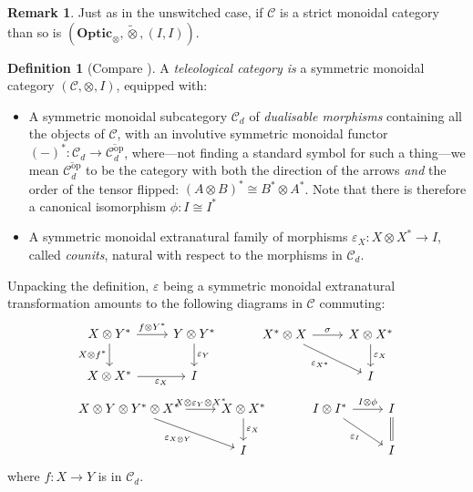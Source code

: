 \documentclass[11pt,a4paper]{article}
\theoremstyle{plain}
\theoremstyle{definition}
\newtheorem{definition}[theorem]{Definition}
\newtheorem{remark}[theorem]{Remark}
\newcommand{\C}{\mathscr{C}}
\newcommand{\Optic}{\mathbf{Optic}}
\newcommand{\switched}{\mathbin{\tilde{\otimes}}}
\newcommand{\op}{\mathrm{op}}
\begin{document}
\begin{remark}
  Just as in the unswitched case, if $\C$ is a strict monoidal category than so is $(\Optic_\otimes, \switched, (I, I))$.
\end{remark}

\begin{definition}[Compare {\cite[Definition 5.1]{CoherenceForLenses}}]
  A \emph{teleological category is} a symmetric monoidal category $(\C, \otimes, I)$, equipped with:
  \begin{itemize}
  \item A symmetric monoidal subcategory $\C_d$ of \emph{dualisable morphisms} containing all the objects of $\C$, with an involutive symmetric monoidal functor ${(-)}^* : \C_d \to \overline{\C_d^\op}$, where---not finding a standard symbol for such a thing---we mean $\overline{\C_d^\op}$ to be the category with both the direction of the arrows \emph{and} the order of the tensor flipped: ${(A \otimes B)}^* \cong B^* \otimes A^*$. Note that there is therefore a canonical isomorphism $\phi : I \cong I^*$
  \item A symmetric monoidal extranatural family of morphisms $\varepsilon_X : X \otimes X^* \to I$, called \emph{counits}, natural with respect to the morphisms in $\C_d$.
  \end{itemize}
\end{definition}
Unpacking the definition, $\varepsilon$ being a symmetric monoidal extranatural transformation amounts to the following diagrams in $\C$ commuting:
\[
  \begin{tikzcd}
    X \otimes Y^* \ar[r, "f \otimes Y^*"]  \ar[d, "X \otimes f^*", swap] & Y \otimes Y^* \ar[d, "\varepsilon_Y"] \\
    X \otimes X^* \ar[r, "\varepsilon_X", swap] & I
  \end{tikzcd} \hspace{1cm}
  \begin{tikzcd}
    X^* \otimes X \ar[r, "\sigma"]  \ar[dr, "\varepsilon_{X^*}", swap] & X \otimes X^* \ar[d, "\varepsilon_X"] \\
    & I
  \end{tikzcd}\]
\[
  \begin{tikzcd}
    X \otimes Y \otimes Y^* \otimes X^* \ar[r, "X \otimes \varepsilon_Y \otimes X^*"]  \ar[dr, "\varepsilon_{X \otimes Y}", swap] & X \otimes X^* \ar[d, "\varepsilon_X"] \\
    & I
  \end{tikzcd} \hspace{1cm}
  \begin{tikzcd}
    I \otimes I^* \ar[r,"I \otimes \phi"] \ar[dr, swap, "\varepsilon_I"] & I \ar[d, equal] \\
    & I
  \end{tikzcd}
\]
where $f : X \to Y$ is in $\C_d$.
\end{document}
